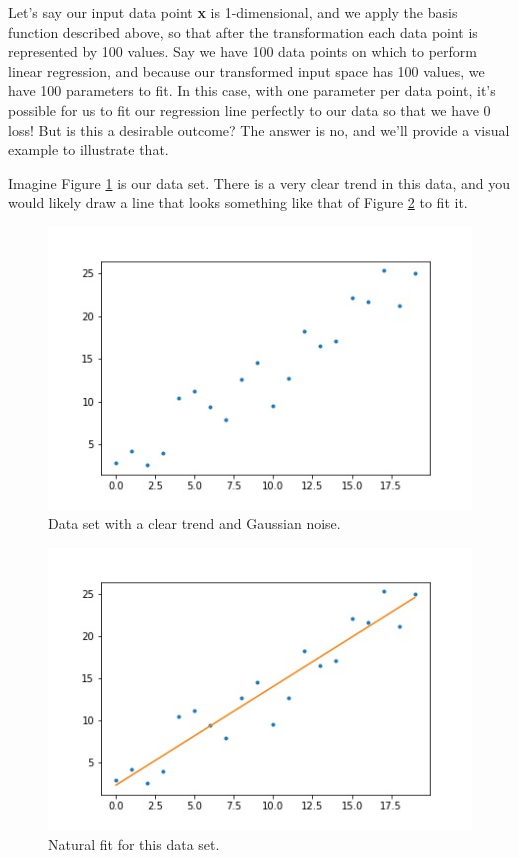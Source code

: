 Let's say our input data point \textbf{x} is 1-dimensional, and we apply the basis function described above, so that after the transformation each data point is represented by 100 values. Say we have 100 data points on which to perform linear regression, and because our transformed input space has 100 values, we have 100 parameters to fit. In this case, with one parameter per data point, it's possible for us to fit our regression line perfectly to our data so that we have 0 loss! But is this a desirable outcome? The answer is no, and we'll provide a visual example to illustrate that.

Imagine Figure \ref{fig:data-set-scattered} is our data set. There is a very clear trend in this data, and you would likely draw a line that looks something like that of Figure \ref{fig:data-set-natural-fit} to fit it.

\begin{figure}
    \centering
    \includegraphics[width=0.5\paperwidth]{../LinearRegression/fig/data_set_scattered_GEN.jpg}
    \caption{Data set with a clear trend and Gaussian noise.}
    \label{fig:data-set-scattered}
\end{figure}

\begin{figure}
    \centering
    \includegraphics[width=0.5\paperwidth]{../LinearRegression/fig/data_set_natural_fit_GEN.jpg}
    \caption{Natural fit for this data set.}
    \label{fig:data-set-natural-fit}
\end{figure}

